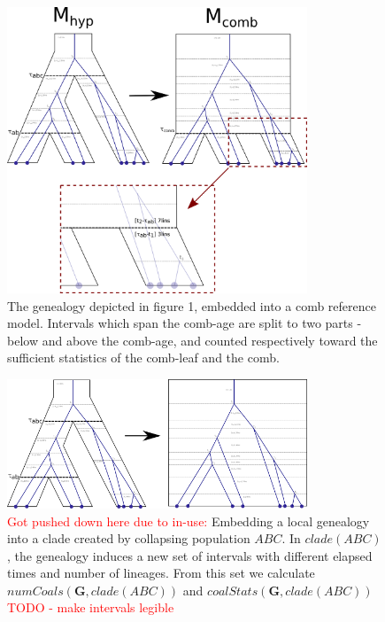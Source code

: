 \documentclass[11pt]{article}
\newcommand{\vect}[1]{\boldsymbol{\mathbf{#1}}}
\newcommand{\G}{\vect{G}}
\newcommand{\1}{\mathbbm{1}}
\begin{document}
\begin{figure}[h]
\centering
\includegraphics[width=0.8\textwidth]
{split_interval_on_comb_age}
\caption{The genealogy depicted in figure 1, embedded into a comb reference model. Intervals which span the comb-age are split to two parts - below and above the comb-age, and counted respectively toward the sufficient statistics of the comb-leaf and the comb.}
\label{fig:comb_collapse_and_split_interval}
\end{figure}


% 
\begin{figure}[h]
\centering
\includegraphics[width=0.8\textwidth]
{embed_in_null_model}
\caption{\textcolor{red}{Got pushed down here due to in-use:} Embedding a local genealogy into a clade created by collapsing population $ABC$. In $clade(ABC)$, the genealogy induces a new set of intervals with different elapsed times and number of lineages. From this set we calculate $numCoals(\G,clade(ABC))$ and $coalStats(\G,clade(ABC))$ \textcolor{red}{TODO - make intervals legible}}
\end{figure}
\end{document}
